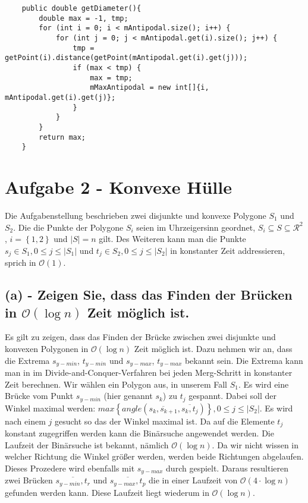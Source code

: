 \documentclass[a4paper]{article}
\begin{document}
\begin{lstlisting}
	public double getDiameter(){
        double max = -1, tmp;
        for (int i = 0; i < mAntipodal.size(); i++) {
            for (int j = 0; j < mAntipodal.get(i).size(); j++) {
                tmp = getPoint(i).distance(getPoint(mAntipodal.get(i).get(j)));
                if (max < tmp) {
                    max = tmp;
                    mMaxAntipodal = new int[]{i, mAntipodal.get(i).get(j)};
                }
            }
        }
        return max;
    }
\end{lstlisting}

\section*{Aufgabe 2 - Konvexe Hülle}

Die Aufgabenstellung beschrieben zwei disjunkte und konvexe Polygone $S_1$ und $S_2$. Die die Punkte der Polygone $S_i$ seien im Uhrzeigersinn geordnet, $S_i \subseteq S \subseteq \mathcal{R}^2$, $i = \left\{1, 2\right\}$ und $|S| = n$ gilt. Des Weiteren kann man die Punkte $s_j \in S_1, 0 \leq j \leq |S_1|$ und $t_j \in S_2, 0 \leq j \leq |S_2|$ in konstanter Zeit addressieren, sprich in $\mathcal{O}(1)$.

\subsection*{(a) - Zeigen Sie, dass das Finden der Brücken in $\mathcal{O}(\log n)$ Zeit möglich ist.}

Es gilt zu zeigen, dass das Finden der Brücke zwischen zwei disjunkte und konvexen Polygonen in $\mathcal{O}(\log n)$ Zeit möglich ist. Dazu nehmen wir an, dass die Extrema $s_{y-min}$, $t_{y-min}$ und $s_{y-max}$, $t_{y-max}$ bekannt sein. Die Extrema kann man in im Divide-and-Conquer-Verfahren bei jeden Merg-Schritt in konstanter Zeit berechnen. Wir wählen ein Polygon aus, in unserem Fall $S_1$. Es wird eine Brücke vom Punkt $s_{y-min}$ (hier genannt $s_k$) zu $t_j$ gespannt. Dabei soll der Winkel maximal werden: $max \left\{angle\left(\overline{s_k,s_{k+1}},\overline{s_k,t_j}\right)\right\}, 0 \leq j \leq |S_2|$. Es wird nach einem $j$ gesucht so das der Winkel maximal ist. Da auf die Elemente $t_j$ konstant zugegriffen werden kann die Binärsuche angewendet werden. Die Laufzeit der Binärsuche ist bekannt, nämlich $\mathcal{O}(\log n)$. Da wir nicht wissen in welcher Richtung die Winkel größer werden, werden beide Richtungen abgelaufen. Dieses Prozedere wird ebenfalls mit $s_{y-max}$ durch gespielt. Daraus resultieren zwei Brücken $\overline{s_{y-min}, t_r}$ und $\overline{s_{y-max}, t_p}$ die in einer Laufzeit von $\mathcal{O}(4 \cdot \log n)$ gefunden werden kann. Diese Laufzeit liegt wiederum in $\mathcal{O}(\log n)$.
\end{document}
